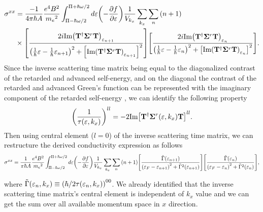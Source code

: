 \begin{widetext}
\begin{equation}
\begin{aligned}
    {\sigma}^{xx} & =
    \frac{-1}{4\pi\hbar A}
    \frac{e^4B^2}{{{m_e}^2}}
    \int_{\Pi-\hbar\omega/2}^{\Pi+ \hbar\omega/2} d\varepsilon
    \qty(
    -\frac{\partial f}{\partial \varepsilon})
    \frac{1}{V_{k_x}} \sum_{k_x} \sum_{n}
    \qty(n+1)
    \\
    & \times
    \qty[
    \frac{2i \text{Im}\qty(\vb{T}^{\dagger} \vb{\Sigma}^r \vb{T})_{\varepsilon_{n+1}}
    }
    {
    \qty(
    \frac{1}{\hbar}\varepsilon -
    \frac{1}{\hbar}\varepsilon_{n+1}
    )^2
    + \qty[\text{Im}\qty(\vb{T}^{\dagger} \vb{\Sigma}^r \vb{T})_{\varepsilon_{n+1}}]^2
    }]
    \qty[
    \frac{2i \text{Im}\qty(\vb{T}^{\dagger} \vb{\Sigma}^r \vb{T})_{\varepsilon_{n}}
    }
    {
    \qty(
    \frac{1}{\hbar}\varepsilon -
    \frac{1}{\hbar}\varepsilon_{n}
    )^2
    + \qty[\text{Im}\qty(\vb{T}^{\dagger} \vb{\Sigma}^r \vb{T})_{\varepsilon_{n}}]^2
    }].
  \end{aligned}
\end{equation}
Since the inverse scattering time matrix being equal to the diagonalized contrast of the retarded and advanced self-energy, and on the diagonal the contrast of the retarded and advanced Green's function can be represented with the imaginary component of the retarded self-energy \cite{wackerl20,wackerlthesis20}, we can identify the following property
\begin{equation} \label{eq_28}
  \qty(\frac{1}{\tau(\varepsilon,k_x)})^{ll} =
  -2\text{Im}\qty[ \vb{T}^{\dagger} \vb{\Sigma}^r(\varepsilon,k_x) \vb{T}]^{ll}.
\end{equation}
Then using central element ($l=0$) of the inverse scattering time matrix, we can restructure the derived conductivity expression as follows
\begin{equation} \label{eq_29}
    {\sigma}^{xx}   =
    \frac{1}{\pi\hbar A}
    \frac{e^4B^2}{{{m_e}^2}}
    \int_{\Pi-\hbar\omega/2}^{\Pi+ \hbar\omega/2} d\varepsilon
    \qty(
    -\frac{\partial f}{\partial \varepsilon})
    \frac{1}{V_{k_x}} \sum_{k_x} \sum_{n}
    \qty(n+1)
    \qty[
    \frac{\tilde{{\Gamma}}(\varepsilon_{n+1})
    }
    {
    \qty(
    \varepsilon_F - \varepsilon_{n+1}
    )^2
    + \tilde{{\Gamma}}^2(\varepsilon_{n+1})
    }]
    \qty[
    \frac{\tilde{{\Gamma}}(\varepsilon_{n})
    }
    {
    \qty(
    \varepsilon_F - \varepsilon_{n}
    )^2
    + \tilde{{\Gamma}}^2(\varepsilon_{n})
    }],
\end{equation}
\end{widetext}
where $\tilde{{\Gamma}}(\varepsilon_n,k_x) \equiv \qty({\hbar}/{2\tau(\varepsilon_n,k_x)})^{00}$. We already identified that the inverse scattering time matrix's central element is independent of $k_x$ value and we can get the sum over all available momentum space in $x$ direction.

